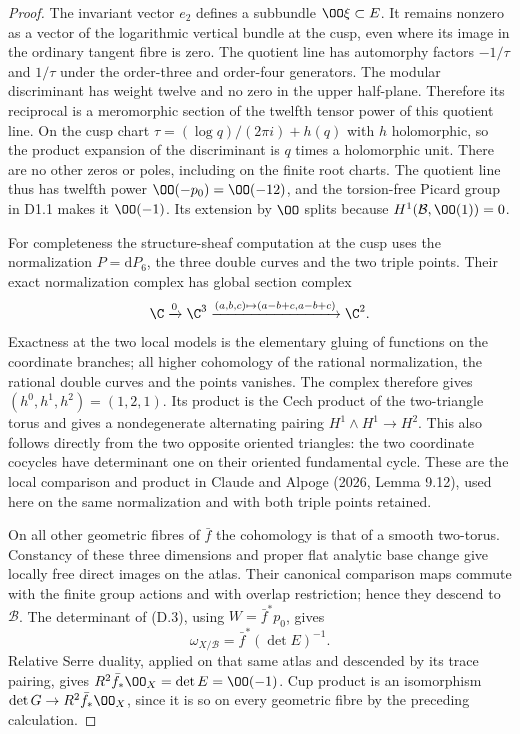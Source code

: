 \begin{proof}
The invariant vector $e_2$ defines a subbundle $\OO\xi\subset E$.
It remains nonzero as a vector of the logarithmic vertical bundle at
the cusp, even where its image in the ordinary tangent fibre is zero.
The quotient line has automorphy factors $-1/\tau$ and $1/\tau$ under
the order-three and order-four generators. The modular discriminant
has weight twelve and no zero in the upper half-plane. Therefore its
reciprocal is a meromorphic section of the twelfth tensor power of
this quotient line. On the cusp chart
$\tau=(\log q)/(2\pi i)+h(q)$ with $h$ holomorphic, so the product
expansion of the discriminant is $q$ times a holomorphic unit.
There are no other zeros or poles, including on the finite root
charts. The quotient line thus has twelfth power
$\OO(-p_0)=\OO(-12)$, and the torsion-free Picard group in D1.1 makes
it $\OO(-1)$. Its extension by $\OO$ splits because
$H^1(\mathcal B,\OO(1))=0$.

For completeness the structure-sheaf computation at the cusp uses the
normalization $P=\mathrm dP_6$, the three double curves and the two
triple points. Their exact normalization complex has global section
complex
\[
 \C\xrightarrow{0}\C^3
 \xrightarrow{(a,b,c)\mapsto(a-b+c,a-b+c)}\C^2.
\]
Exactness at the two local models is the elementary gluing of functions
on the coordinate branches; all higher cohomology of the rational
normalization, the rational double curves and the points vanishes.
The complex therefore gives $(h^0,h^1,h^2)=(1,2,1)$. Its product is
the Cech product of the two-triangle torus and gives a nondegenerate
alternating pairing $H^1\wedge H^1\to H^2$. This also follows directly
from the two opposite oriented triangles: the two coordinate cocycles
have determinant one on their oriented fundamental cycle. These are
the local comparison and product in Claude and Alpoge (2026,
Lemma 9.12), used here on the same normalization and with both triple
points retained.

On all other geometric fibres of $\bar f$ the cohomology is that of a
smooth two-torus. Constancy of these three dimensions and proper flat
analytic base change give locally free direct images on the atlas.
Their canonical comparison maps commute with the finite group actions
and with overlap restriction; hence they descend to $\mathcal B$.
The determinant of (D.3), using $W=\bar f^*p_0$, gives
\[
 \omega_{X/\mathcal B}=\bar f^*(\det E)^{-1}.
\]
Relative Serre duality, applied on that same atlas and descended by
its trace pairing, gives $R^2\bar f_*\OO_X=\det E=\OO(-1)$.
Cup product is an isomorphism $\det G\to R^2\bar f_*\OO_X$, since it
is so on every geometric fibre by the preceding calculation.


\end{proof}
